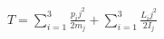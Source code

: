 \documentclass[preview]{standalone}
\begin{document}
\begin{align*}
T = \sum_{i=1}^3\frac{p_ij^2}{2m_j} + \sum_{i=1}^3\frac{L_ij^2}{2I_j}
\end{align*}
\end{document}
